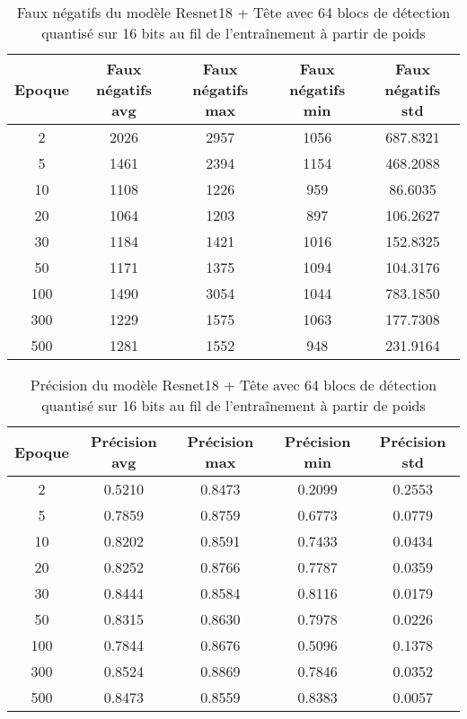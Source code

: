 \begin{table}[!ht]
    \caption{Faux négatifs du modèle Resnet18 + Tête avec 64 blocs de détection quantisé sur 16 bits au fil de l'entraînement à partir de poids}
    \label{tab:qresnet18+head_64n_false_negative_16b_from_weights}
    \centering
    \begin{tabular}{ |c||c|c|c|c|  }
        \hline
        \rowcolor{gray!50}
        Epoque & Faux négatifs avg & Faux négatifs max & Faux négatifs min & Faux négatifs std\\
        \hline
        2 & 2026 & 2957 & 1056 & 687.8321\\
        5 & 1461 & 2394 & 1154 & 468.2088\\
        10 & 1108 & 1226 & 959 & 86.6035\\
        20 & 1064 & 1203 & 897 & 106.2627\\
        30 & 1184 & 1421 & 1016 & 152.8325\\
        50 & 1171 & 1375 & 1094 & 104.3176\\
        100 & 1490 & 3054 & 1044 & 783.1850\\
        300 & 1229 & 1575 & 1063 & 177.7308\\
        500 & 1281 & 1552 & 948 & 231.9164\\
        \hline
    \end{tabular}
\end{table}

\begin{table}[!ht]
    \caption{Précision du modèle Resnet18 + Tête avec 64 blocs de détection quantisé sur 16 bits au fil de l'entraînement à partir de poids}
    \label{tab:qresnet18+head_64n_precision_16b_from_weights}
    \centering
    \begin{tabular}{ |c||c|c|c|c|  }
        \hline
        \rowcolor{gray!50}
        Epoque & Précision avg & Précision max & Précision min & Précision std\\
        \hline
        2 & 0.5210 & 0.8473 & 0.2099 & 0.2553\\
        5 & 0.7859 & 0.8759 & 0.6773 & 0.0779\\
        10 & 0.8202 & 0.8591 & 0.7433 & 0.0434\\
        20 & 0.8252 & 0.8766 & 0.7787 & 0.0359\\
        30 & 0.8444 & 0.8584 & 0.8116 & 0.0179\\
        50 & 0.8315 & 0.8630 & 0.7978 & 0.0226\\
        100 & 0.7844 & 0.8676 & 0.5096 & 0.1378\\
        300 & 0.8524 & 0.8869 & 0.7846 & 0.0352\\
        500 & 0.8473 & 0.8559 & 0.8383 & 0.0057\\
        \hline
    \end{tabular}
\end{table}


